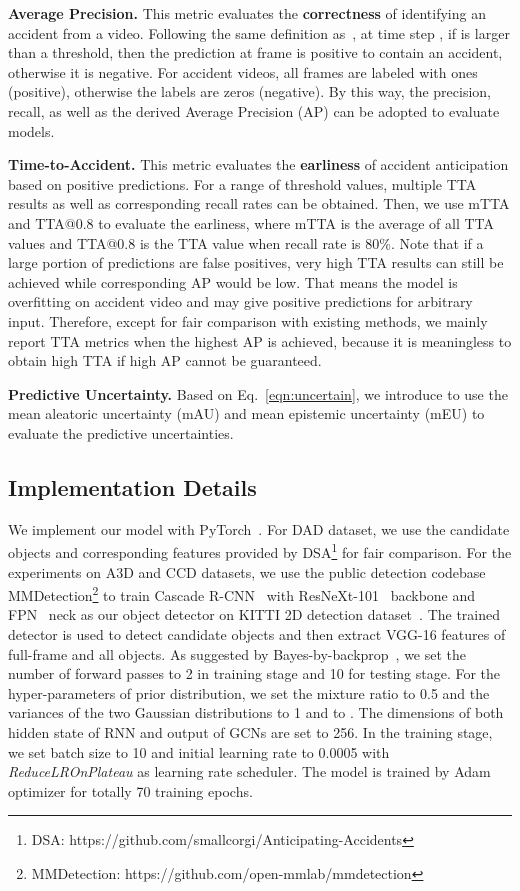 \documentclass[sigconf]{acmart}
\begin{document}
\textbf{Average Precision.} This metric evaluates the \textbf{correctness} of identifying an accident from a video. Following the same definition as~\cite{ChanACCV2016}, at time step , if  is larger than a threshold, then the prediction at frame  is positive to contain an accident, otherwise it is negative. For accident videos, all frames are labeled with ones (positive), otherwise the labels are zeros (negative). By this way, the precision, recall, as well as the derived Average Precision (AP) can be adopted to evaluate models.

\textbf{Time-to-Accident.} This metric evaluates the \textbf{earliness} of accident anticipation based on positive predictions. 
For a range of threshold values, multiple TTA results as well as corresponding recall rates can be obtained. Then, we use mTTA and TTA@0.8 to evaluate the earliness, where mTTA is the average of all TTA values and TTA@0.8 is the TTA value when recall rate is 80\%.
Note that if a large portion of predictions are false positives, very high TTA results can still be achieved while corresponding AP would be low. That means the model is overfitting on accident video and may give positive predictions for arbitrary input.
Therefore, except for fair comparison with existing methods, we mainly report TTA metrics when the highest AP is achieved, because it is meaningless to obtain high TTA if high AP cannot be guaranteed.

\textbf{Predictive Uncertainty.} Based on Eq.~\ref{eqn:uncertain}, we introduce to use the mean aleatoric uncertainty (mAU) and mean epistemic uncertainty (mEU) to evaluate the predictive uncertainties.

\subsection{Implementation Details}

We implement our model with PyTorch~\cite{pytorch}. For DAD dataset, we use the candidate objects and corresponding features provided by DSA\footnote{DSA: https://github.com/smallcorgi/Anticipating-Accidents} for fair comparison. For the experiments on A3D and CCD datasets, we use the public detection codebase MMDetection\footnote{MMDetection: https://github.com/open-mmlab/mmdetection} to train Cascade R-CNN~\cite{CaiCVPR2018} with ResNeXt-101~\cite{XieCVPR2017} backbone and FPN~\cite{LinCVPR2017} neck as our object detector on KITTI 2D detection dataset~\cite{Geiger2012CVPR}. The trained detector is used to detect candidate objects and then extract VGG-16 features of full-frame and all objects. As suggested by Bayes-by-backprop~\cite{BlundellJMLR2015}, we set the number of forward passes  to 2 in training stage and 10 for testing stage. For the hyper-parameters of prior distribution, we set the mixture ratio  to 0.5 and the variances of the two Gaussian distributions  to 1 and  to . The dimensions of both hidden state of RNN and output of GCNs are set to 256. In the training stage, we set batch size to 10 and initial learning rate to 0.0005 with \emph{ReduceLROnPlateau} as learning rate scheduler. The model is trained by Adam optimizer for totally 70 training epochs.
\end{document}
